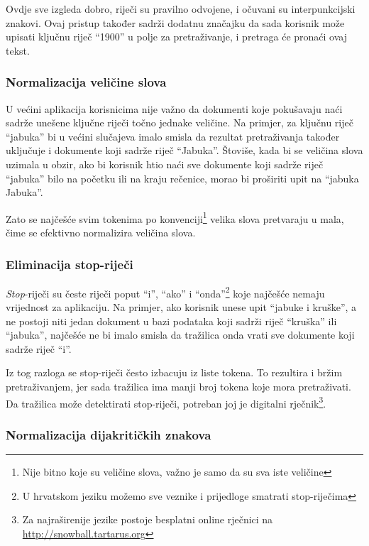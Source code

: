 \documentclass[a4paper,twoside,12pt]{scrreprt}
\begin{document}
Ovdje sve izgleda dobro, riječi su pravilno odvojene, i očuvani su interpunkcijski znakovi. Ovaj pristup također sadrži dodatnu značajku da sada korisnik može upisati ključnu riječ ``1900'' u polje za pretraživanje, i pretraga će pronaći ovaj tekst.

\subsubsection{Normalizacija veličine slova}

U većini aplikacija korisnicima nije važno da dokumenti koje pokušavaju naći sadrže unešene ključne riječi točno jednake veličine. Na primjer, za ključnu riječ ``jabuka'' bi u većini slučajeva imalo smisla da rezultat pretraživanja također uključuje i dokumente koji sadrže riječ ``Jabuka''. Štoviše, kada bi se veličina slova uzimala u obzir, ako bi korisnik htio naći sve dokumente koji sadrže riječ ``jabuka'' bilo na početku ili na kraju rečenice, morao bi proširiti upit na ``jabuka Jabuka''.

Zato se najčešće svim tokenima po konvenciji\footnote{Nije bitno koje su veličine slova, važno je samo da su sva iste veličine} velika slova pretvaraju u mala, čime se efektivno normalizira veličina slova.

\subsubsection{Eliminacija stop-riječi}

\textit{Stop}-riječi su česte riječi poput ``i'', ``ako'' i ``onda''\footnote{U hrvatskom jeziku možemo sve veznike i prijedloge smatrati stop-riječima} koje najčešće nemaju vrijednost za aplikaciju. Na primjer, ako korisnik unese upit ``jabuke i kruške'', a ne postoji niti jedan dokument u bazi podataka koji sadrži riječ ``kruška'' ili ``jabuka'', najčešće ne bi imalo smisla da tražilica onda vrati sve dokumente koji sadrže riječ ``i''.

Iz tog razloga se stop-riječi često izbacuju iz liste tokena. To rezultira i bržim pretraživanjem, jer sada tražilica ima manji broj tokena koje mora pretraživati. Da tražilica može detektirati stop-riječi, potreban joj je digitalni rječnik\footnote{Za najraširenije jezike postoje besplatni online rječnici na \url{http://snowball.tartarus.org}}.

\subsubsection{Normalizacija dijakritičkih znakova}
\end{document}
